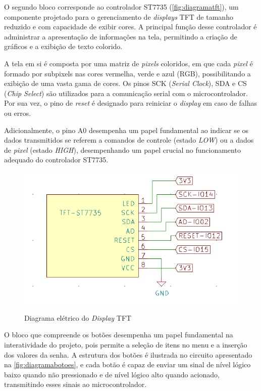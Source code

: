 O segundo bloco corresponde ao controlador ST7735 (\autoref{fig:diagramatft}), 
um componente projetado para o gerenciamento de \textit{displays} TFT de tamanho 
reduzido e com capacidade de exibir cores. A principal função desse 
controlador é administrar a apresentação de informações na tela, 
permitindo a criação de gráficos e a exibição de texto colorido.

A tela em si é composta por uma matriz de \textit{pixels} coloridos, em que 
cada \textit{pixel} é formado por subpixels nas cores vermelha, verde e azul 
(RGB), possibilitando a exibição de uma vasta gama de cores. Os pinos 
SCK (\textit{Serial Clock}), SDA e CS (\textit{Chip Select}) são utilizados para a 
comunicação serial com o microcontrolador. Por sua vez, o pino de 
\textit{reset} é designado para reiniciar o \textit{display} em caso de falhas ou erros.

Adicionalmente, o pino A0 desempenha um papel fundamental ao indicar 
se os dados transmitidos se referem a comandos de controle (estado \textit{LOW}) 
ou a dados de \textit{pixel} (estado \textit{HIGH}), desempenhando um papel crucial no 
funcionamento adequado do controlador ST7735.

\begin{figure}[h!]
    \centering
    \caption{Diagrama elétrico do \textit{Display} TFT}
    \includegraphics[scale=0.36]{figuras/modulo_tft.png}
    \fonte{}%
    \label{fig:diagramatft}
    \centering
\end{figure}

O bloco que compreende os botões desempenha um papel fundamental na 
interatividade do projeto, pois permite a seleção de itens no menu 
e a inserção dos valores da senha. A estrutura dos botões é 
ilustrada no circuito apresentado na \autoref{fig:diagramabotoes}, e 
cada botão é capaz de enviar um sinal de nível lógico baixo quando não 
pressionado e de nível lógico alto quando acionado, transmitindo esses 
sinais ao microcontrolador.

